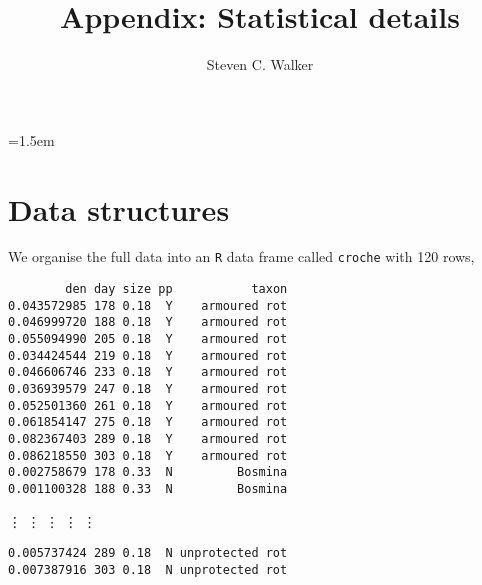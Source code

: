 \documentclass[12pt]{ecologyFORAPPENDIX}
\title{Appendix:  Statistical details}
\author{Steven C. Walker}
\begin{document}
\maketitle
\raggedright
\parindent=1.5em



\tableofcontents

\section{Data structures}

We organise the full data into an \texttt{R} data frame called \texttt{croche} with 120 rows,
\vspace{-18pt}
\singlespace
\begin{verbatim}
        den day size pp           taxon
0.043572985 178 0.18  Y    armoured rot
0.046999720 188 0.18  Y    armoured rot
0.055094990 205 0.18  Y    armoured rot
0.034424544 219 0.18  Y    armoured rot
0.046606746 233 0.18  Y    armoured rot
0.036939579 247 0.18  Y    armoured rot
0.052501360 261 0.18  Y    armoured rot
0.061854147 275 0.18  Y    armoured rot
0.082367403 289 0.18  Y    armoured rot
0.086218550 303 0.18  Y    armoured rot
0.002758679 178 0.33  N         Bosmina
0.001100328 188 0.33  N         Bosmina
\end{verbatim}
\vspace{-11pt}
\hspace{35pt}
\vdots
\hspace{38pt}
\vdots
\hspace{20pt}
\vdots
\hspace{18pt}
\vdots
\hspace{40pt}
\vdots
\vspace{-9pt}
\begin{verbatim}
0.005737424 289 0.18  N unprotected rot
0.007387916 303 0.18  N unprotected rot
\end{verbatim}
\doublespace
\end{document}
